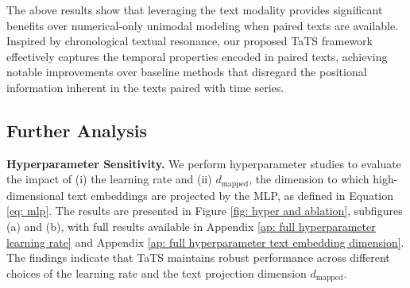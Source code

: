 The above results show that leveraging the text modality provides significant benefits over numerical-only unimodal modeling when paired texts are available. Inspired by chronological textual resonance, our proposed TaTS framework effectively captures the temporal properties encoded in paired texts, achieving notable improvements over baseline methods that disregard the positional information inherent in the texts paired with time series.


\begin{figure*}[t]
\centering
{}
\vspace{-2mm}
\caption{Further analysis of our TaTS framework. (a) Learning rate sensitivity: TaTS maintains stable performance across different learning rates (full results in Appendix \ref{ap: full hyperparameter learning rate}).
(b) Text Projection Dimension sensitivity: TaTS remains robust across varying $d_{\text{mapped}}$ (full results in Appendix \ref{ap: full hyperparameter text embedding dimension}).
(c) Varying text encoder: TaTS consistently outperforms baselines across different text encoders (full results in Appendix \ref{ap: full ablation of text encoder}).
(d) Efficiency: TaTS introduces only a minor parameter increase ($\sim1\%$) but significantly improves the performance according to Table \ref{tab: main forecasting}.}
\label{fig: hyper and ablation}
\vspace{-3mm}
\end{figure*}


\subsection{Further Analysis}
\label{subsec: ablation}

\textbf{Hyperparameter Sensitivity.}
We perform hyperparameter studies to evaluate the impact of (i) the learning rate and (ii) $d_{\text{mapped}}$, the dimension to which high-dimensional text embeddings are projected by the MLP, as defined in Equation \ref{eq: mlp}. The results are presented in Figure \ref{fig: hyper and ablation}, subfigures (a) and (b), with full results available in Appendix \ref{ap: full hyperparameter learning rate} and Appendix \ref{ap: full hyperparameter text embedding dimension}. The findings indicate that TaTS maintains robust performance across different choices of the learning rate and the text projection dimension $d_{\text{mapped}}$.

